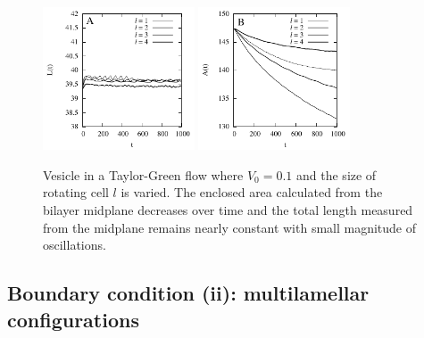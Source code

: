 \documentclass[aps,prl,preprint,groupedaddress]{revtex4-2}
\begin{document}
\begin{figure}
  \begin{center}
  \includegraphics[width=0.4\textwidth]{VTG_Len.pdf}
  \includegraphics[width=0.4\textwidth]{VTG_Area.pdf}
  \end{center}
  \vspace{-20pt}  
  \caption{\label{fig:VTG_AreaLen} Vesicle in a Taylor-Green flow where $V_0=0.1$ and the size of rotating cell $l$ is varied. The enclosed area calculated from the bilayer midplane decreases over time and the total length measured from the midplane remains nearly constant with small magnitude of oscillations. }
\end{figure}



\subsection{Boundary condition (ii):  multilamellar configurations}
\end{document}
